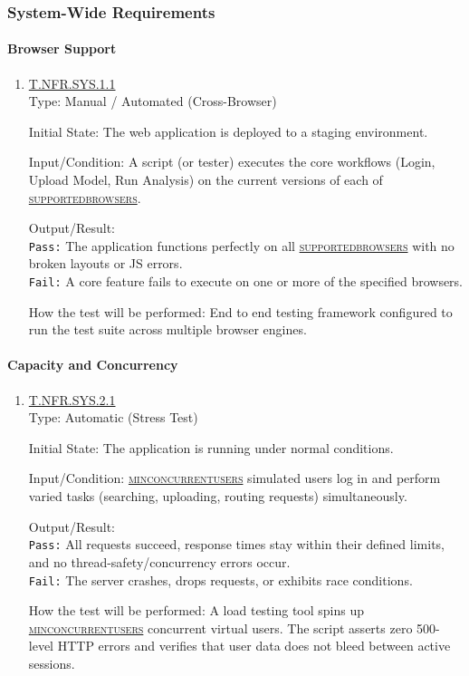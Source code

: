 \documentclass[12pt, titlepage]{article}
\newcommand{\testdef}[1]{\leavevmode\hypertarget{test:#1}{}\hyperlink{trace:#1}{#1}}
\DeclareRobustCommand{\cname}[1]{{\renewcommand{\_}{\textunderscore\allowbreak}\textsc{#1}}}
\newcommand{\constfirst}[1]{\leavevmode\hypertarget{constfirst:\detokenize{#1}}{}\hyperlink{const:\detokenize{#1}}{\cname{#1}}}
\newcommand{\const}[1]{\hyperlink{const:\detokenize{#1}}{\cname{#1}}}
\begin{document}
\subsubsection{System-Wide Requirements}

\paragraph{Browser Support}
\begin{enumerate}
  \item \testdef{T.NFR.SYS.1.1}\\
  Type: Manual / Automated (Cross-Browser)

  Initial State: The web application is deployed to a staging environment.

  Input/Condition: A script (or tester) executes the core workflows (Login, Upload Model, Run Analysis) on the current versions of each of \constfirst{supported\_browsers}.

  Output/Result: \\
  \texttt{Pass:} The application functions perfectly on all \const{supported\_browsers} with no broken layouts or JS errors.\\
  \texttt{Fail:} A core feature fails to execute on one or more of the specified browsers.

  How the test will be performed: End to end testing framework configured to run the test suite across multiple browser engines. 
\end{enumerate}

\paragraph{Capacity and Concurrency}
\begin{enumerate}
  \item \testdef{T.NFR.SYS.2.1}\\
  Type: Automatic (Stress Test)

  Initial State: The application is running under normal conditions.

  Input/Condition: \constfirst{min\_concurrent\_users} simulated users log in and perform varied tasks (searching, uploading, routing requests) simultaneously.

  Output/Result: \\
  \texttt{Pass:} All requests succeed, response times stay within their defined limits, and no thread-safety/concurrency errors occur.\\
  \texttt{Fail:} The server crashes, drops requests, or exhibits race conditions.

  How the test will be performed: A load testing tool spins up \const{min\_concurrent\_users} concurrent virtual users. The script asserts zero 500-level HTTP errors and verifies that user data does not bleed between active sessions.
\end{enumerate}
\end{document}

